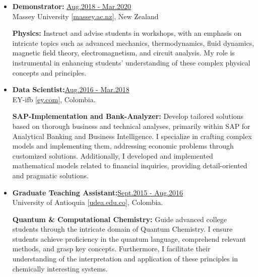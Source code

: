\begin{itemize}
    \item {\bf Demonstrator:} \hfill \href{.}{Aug.2018 - Mar.2020}\\
          Massey University [\href{www.massey.ac.nz}{massey.ac.nz}],
          New Zealand

              {\noindent
                  \textbf{Physics:}
                  Instruct and advise students in workshops, with an emphasis on intricate topics such as advanced mechanics, thermodynamics, fluid dynamics, magnetic field theory, electromagnetism, and circuit analysis. My role is instrumental in enhancing students' understanding of these complex physical concepts and principles.
              }



    \item {\bf Data Scientist:}\hfill \href{.}{Aug.2016 - Mar.2018}\\
          EY-ifb [\href{www.ey.com/en\_gl/ey-ifb}{ey.com}],
          Colombia.

              {\noindent
                  \textbf{SAP-Implementation and Bank-Analyzer:}
                  Develop tailored solutions based on thorough business and technical analyses, primarily within SAP for Analytical Banking and Business Intelligence. I specialize in crafting complex models and implementing them, addressing economic problems through customized solutions. Additionally, I developed and implemented mathematical models related to financial inquiries, providing detail-oriented and pragmatic solutions.
              }

    \item {\bf Graduate Teaching Assistant:}\hfill \href{.}{Sept.2015 - Aug.2016}\\
          University of Antioquia [\href{www.udea.edu.co}{udea.edu.co}],
          Colombia.

              {\noindent
                  \textbf{Quantum \& Computational Chemistry:}
                  Guide advanced college students through the intricate domain of Quantum Chemistry. I ensure students achieve proficiency in the quantum language, comprehend relevant methods, and grasp key concepts. Furthermore, I facilitate their understanding of the interpretation and application of these principles in chemically interesting systems.
              }

\end{itemize}
